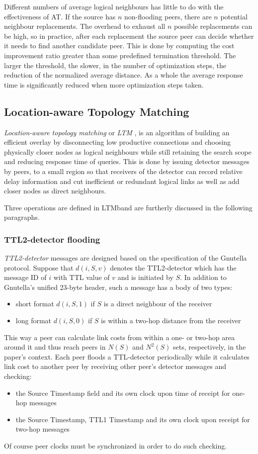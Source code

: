 \documentclass[a4paper,10pt]{article}
\begin{document}
Different numbers of average logical neighbours has little to do with the effectiveness of AT. If the source has $n$ non-flooding peers, there are $n$ potential neighbour replacements. The overhead to exhaust all $n$ possible replacements can be high, so in practice, after each replacement the source peer can decide whether it needs to find another candidate peer. This is done by computing the cost improvement ratio greater than some predefined termination threshold. The larger the threshold, the slower, in the number of optimization steps, the reduction of the normalized average distance. As a whole the average response time is significantly reduced when more optimization steps taken.

\subsection{Location-aware Topology Matching}
\emph{Location-aware topology matching} or \emph{LTM} \cite{liu_ltm_2004}, is an algorithm of building an efficient overlay by disconnecting low productive connections and choosing physically closer nodes as logical neighbours while still retaining the search scope and reducing response time of queries. This is done by issuing detector messages by peers, to a small region so that receivers of the detector can record relative delay information and cut inefficient or redundant logical links as well as add closer nodes as direct neighbours.

Three operations are defined in LTMband are furtherly discussed in the following paragraphs.

\subsubsection*{TTL2-detector flooding}
\emph{TTL2-detector} messages are designed based on the specification of the Gnutella protocol. Suppose that $d(i, S, v)$ denotes the TTL2-detector which has the message ID of $i$ with TTL value of $v$ and is initiated by $S$. In addition to Gnutella's unified 23-byte header, such a message has a body of two types:
\begin{itemize}
  \item short format $d(i, S, 1)$ if $S$ is a direct neighbour of the receiver
  \item long format $d(i, S, 0)$ if $S$ is within a two-hop distance from the receiver
\end{itemize}
This way a peer can calculate link costs from within a one- or two-hop area around it and thus reach peers in $N(S)$ and $N^2(S)$ sets, respectively, in the paper's context. Each peer floods a TTL-detector periodically while it calculates link cost to another peer by receiving other peer's detector messages and checking:
\begin{itemize}
  \item the Source Timestamp field and its own clock upon time of receipt for one-hop messages
  \item the Source Timestamp, TTL1 Timestamp and its own clock upon receipt for two-hop messages
\end{itemize}
Of course peer clocks must be synchronized in order to do such checking.
\end{document}
